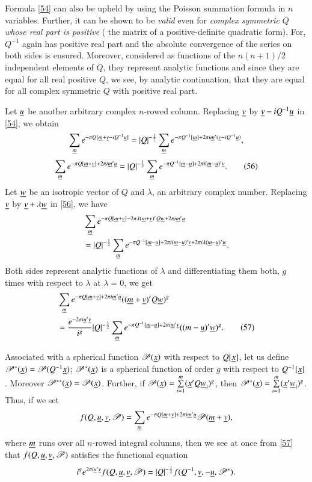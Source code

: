 Formula \eqref{54} can also be upheld by using the Poisson summation
formula in $n$ variables. Further, it can be shown to be {\em valid}
even for {\em complex symmetric $Q$ whose real part is positive} (\ie
the matrix of a positive-definite quadratic form). For, $Q^{-1}$ again
has positive real part and the absolute convergence of the series on
both sides is ensured. Moreover, considered as functions of the
$n(n+1)/2$ independent elements of $Q$, they represent analytic
functions and since they are equal for all real positive $Q$, we see,
by analytic continuation, that they are equal for all complex
symmetric $Q$ with positive real part.

Let $\underline{u}$ be another arbitrary complex $n$-rowed column. Replacing
$\underline{v}$ by $\underline{v}-iQ^{-1}\underline{u}$ in \eqref{54}, we obtain
$$
\sum_{\underline{m}}e^{-\pi
  Q[\underline{m}+\underline{v}-iQ^{-1}\underline{u}]}=|Q|^{-\frac{1}{2}}\sum_{\underline{m}}e^{-\pi
  Q^{-1}[\underline{m}]+2\pi i\underline{m}'(\underline{v}-iQ^{-1}\underline{u})}, 
$$
\ie
\begin{equation*}
\sum_{\underline{m}}e^{-\pi Q[\underline{m}+\underline{v}]+2\pi
  i\underline{m}'\underline{u}}=|Q|^{-\frac{1}{2}}\sum_{\underline{m}}e^{-\pi
  Q^{-1}[\underline{m}-\underline{u}]+2\pi i(\underline{m}-\underline{u})'\underline{v}}.\tag{56}\label{56}
\end{equation*}
Let $\underline{w}$ be an isotropic vector of $Q$ and $\lambda$, an arbitrary
complex number. Replacing\pageoriginale $\underline{v}$ by
$\underline{v}+\lambda\underline{w}$ in \eqref{56}, we have
\begin{align*}
& \sum_{\underline{m}}e^{-\pi
    Q[\underline{m}+\underline{v}]-2\pi\lambda(\underline{m}+\underline{v})'Q\underline{w}+2\pi
    i\underline{m}'\underline{u}}\\
&= |Q|^{-\frac{1}{2}}\sum_{\underline{m}}e^{-\pi Q^{-1}[\underline{m}-\underline{u}]+2\pi
    i(\underline{m}-\underline{u})'\underline{v}+2\pi i\lambda(\underline{m}-\underline{u})'\underline{w}}.
\end{align*}
Both sides represent analytic functions of $\lambda$ and
differentiating them both, $g$ times with respect to $\lambda$ at
$\lambda=0$, we get
\begin{align*}
& \sum_{\underline{m}}e^{-\pi Q[\underline{m}+\underline{v}]+2\pi
  i\underline{m}'\underline{u}}((\underline{m}+\underline{v})'Q\underline{w})^{g} \\
&= \frac{e^{-2\pi
      i\underline{u}'\underline{v}}}{i^{g}}|Q|^{-\frac{1}{2}}\sum_{\underline{m}}e^{-\pi
    Q^{-1}[\underline{m}-\underline{u}]+2\pi
    i\underline{m}'\underline{v}}((m-\underline{u})'\underline{w})^{g}.\tag{57}\label{57} 
\end{align*}

Associated with a spherical function $\mathscr{P}(\underline{x})$ with
respect to $Q[\underline{x}]$, let us define
$\mathscr{P}^{\ast}(\underline{x})=\mathscr{P}(Q^{-1}\underline{x})$;
$\mathscr{P}^{\ast}(\underline{x})$ is a spherical function of order $g$ with
respect to $Q^{-1}[\underline{x}]$. Moreover
$\mathscr{P}^{\ast\ast}(\underline{x})=\mathscr{P}(\underline{x})$. Further, if
$\mathscr{P}(\underline{x})=\sum\limits^{m}_{i=1}(\underline{x}'Q\underline{w}_{i})^{g}$,
then
$\mathscr{P}^{\ast}(\underline{x})=\sum\limits^{m}_{i=1}(\underline{x}'\underline{w}_{i})^{g}$. Thus,
if we set
$$
f(Q,\underline{u},\underline{v},\mathscr{P})=\sum_{\underline{m}}e^{-\pi
  Q[\underline{m}+\underline{v}]+2\pi i\underline{m}'\underline{u}}\mathscr{P}(\underline{m}+\underline{v}),
$$
where $\underline{m}$ runs over all $n$-rowed integral columns, then we see
at once from \eqref{57} that $f(Q,\underline{u},\underline{v},\mathscr{P})$
satisfies the functional equation
$$
i^{g}e^{2\pi
  i\underline{u}'\underline{v}}f(Q,\underline{u},\underline{v},\mathscr{P})=|Q|^{-\frac{1}{2}}f(Q^{-1},\underline{v},-\underline{u},\mathscr{P}^{\ast}). 
$$

